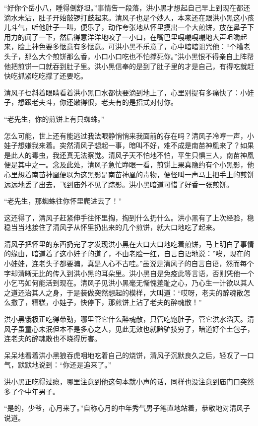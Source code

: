 “好你个岳小八，睡得倒舒坦。”事情告一段落，洪小黑才想起自己早上到现在都还滴水未沾，肚子开始敲锣打鼓起来。清风子也是个妙人，本来还在跟洪小黑这小孩儿斗气，听他肚子一叫，便乐了，动作夸张地从怀里摸出一个大煎饼，放在鼻子下用力的闻了一下，然后得意洋洋地咬了一小口，在嘴巴里嘎嘣嘎嘣地大声咀嚼起来，脸上神色要多惬意有多惬意。可洪小黑不乐意了，心中暗暗诅咒他：“个糟老头子，那么大个煎饼那么香，小口小口吃也不怕撑死你。”洪小黑恨不得亲自上阵帮他把煎饼一口就吞到肚子里。洪小黑信奉的是到了肚子里的才是自己，有得吃就赶快吃抓紧吃吃撑了还要吃。

清风子乜斜着眼睛看着洪小黑口水都快要滴到地上了，心里别提有多痛快了：小娃子，想跟老夫斗，你还嫩得很，老夫有的是招式对付你。

“老先生，你的煎饼上有只蜘蛛。”

怎么可能，世上还有能逃过我法眼静悄悄来我面前的存在吗？清风子冷哼一声，小娃子想嫌我来着。突然清风子想起一事，暗叫不好，难不成是南苗神凰来了？如果是此人的毒虫，我还真无法察觉。清风子天不怕地不怕，平生只惧三人，南苗神凰便是其中之一。念及此处，清风子急忙睁眼一看，煎饼上果真隐约有个小黑影，他心里想着南苗神凰便以为这黑影是南苗神凰的毒物，便怪叫一声马上把手上的煎饼远远地丢了出去，飞到庙外不见了踪影。洪小黑暗道可惜了好香一张煎饼。

“老先生，那蜘蛛往你怀里爬进去了！”

这还得了，清风子赶紧伸手往怀里掏，掏到什么扔什么。洪小黑有了上次经验，稳稳当当地接住了清风子从怀里扔出来的几个煎饼，就大口地吃了起来。

清风子把怀里的东西扔完了才发现洪小黑在大口大口地吃着煎饼，马上明白了事情的缘由，暗道着了这小娃子的道了，不由老脸一红，自言自语地说：”唉，现在的小娃娃，连老头子都要骗，真是人心不古哇。”虽说是清风子的自言自语，然而每个字却清晰无比的传入到洪小黑的耳朵里。洪小黑自是免疫此等言语，否则凭他一个小乞丐如何能活到现在。清风子见洪小黑毫无惭愧羞耻之心，乃心生一计欲以其人之道还治其人之身，于是装做突然想起的模样，大叫道：“哎呀，老夫的醉魂散怎么撒了，糟糕，小娃子，快停下，那煎饼上沾了老夫的醉魂散！”

洪小黑饿极正吃得带劲，哪里管它什么醉魂散，只管吃饱肚子，管它洪水滔天。清风子虽童心未泯但本不是多心之人，见此无效也就黔驴技穷了，暗道好个土包子，连老夫的醉魂散也不晓得厉害。

呆呆地看着洪小黑狼吞虎咽地吃着自己的烧饼，清风子沉默良久之后，轻叹了一口气，默默地说到：“你还是追来了。”

洪小黑正吃得过瘾，哪里注意到他这句本就小声的话，同样也没注意到庙门口突然多了个中年男子。

“是的，少爷，心月来了。”自称心月的中年秀气男子笔直地站着，恭敬地对清风子说道。

